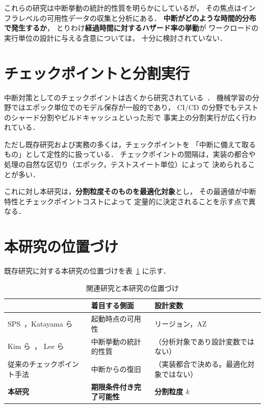 \documentclass[11pt,a4paper]{ltjsreport}
\begin{document}
これらの研究は中断挙動の統計的性質を明らかにしているが，
その焦点はインフラレベルの可用性データの収集と分析にある．
\textbf{中断がどのような時間的分布で発生するか}，
とりわけ\textbf{経過時間に対するハザード率の挙動}が
ワークロードの実行単位の設計に与える含意については，
十分に検討されていない．

\section{チェックポイントと分割実行}

中断対策としてのチェックポイントは古くから研究されている~\cite{Lin2022Survey}．
機械学習の分野ではエポック単位でのモデル保存が一般的であり，
CI/CD の分野でもテストのシャード分割やビルドキャッシュといった形で
事実上の分割実行が広く行われている．

ただし既存研究および実務の多くは，チェックポイントを
「中断に備えて取るもの」として定性的に扱っている．
チェックポイントの間隔は，実装の都合や
処理の自然な区切り（エポック，テストスイート単位）によって
決められることが多い．

これに対し本研究は，\textbf{分割粒度そのものを最適化対象}とし，
その最適値が中断特性とチェックポイントコストによって
定量的に決定されることを示す点で異なる．

\section{本研究の位置づけ}

既存研究に対する本研究の位置づけを表~\ref{tab:related} に示す．

\begin{table}[htbp]
\centering
\caption{関連研究と本研究の位置づけ}
\label{tab:related}
\small
\begin{tabularx}{\textwidth}{@{}lXX@{}}
\toprule
 & \textbf{着目する側面} & \textbf{設計変数} \\
\midrule
SPS~\cite{AWSSPS}，Katayama ら~\cite{Katayama2022}
  & 起動時点の可用性
  & リージョン，AZ \\
\addlinespace
Kim ら~\cite{Kim2024SpotInterruption}，
Lee ら~\cite{Lee2022SpotLake}
  & 中断挙動の統計的性質
  & （分析対象であり設計変数ではない） \\
\addlinespace
従来のチェックポイント手法~\cite{Lin2022Survey}
  & 中断からの復旧
  & （実装都合で決める。最適化対象ではない） \\
\addlinespace
\textbf{本研究}
  & \textbf{期限条件付き完了可能性}
  & \textbf{分割粒度 $k$} \\
\bottomrule
\end{tabularx}
\end{table}
\end{document}

